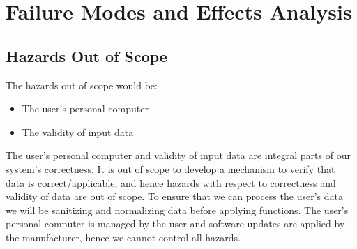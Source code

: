 \documentclass{article}
\begin{document}
\section{Failure Modes and Effects Analysis}
\subsection{Hazards Out of Scope}
The hazards out of scope would be:
\begin{itemize}
    \item The user's personal computer
    \item The validity of input data
\end{itemize}

\noindent The user's personal computer and validity of input data are integral parts of our system's correctness. It is out of scope to develop a mechanism to verify that data is correct/applicable, and hence hazards with respect to correctness and validity of data are out of scope. To ensure that we can process the user's data we will be sanitizing and normalizing data before applying functions. The user's personal computer is managed by the user and software updates are applied by the manufacturer, hence we cannot control all hazards. 
\newpage 
\end{document}
